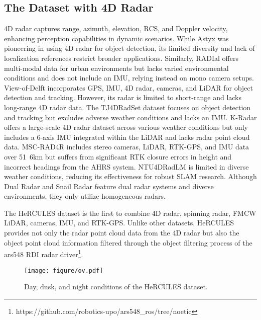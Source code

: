 \subsection{The Dataset with 4D Radar}
 4D radar captures range, azimuth, elevation, \ac{RCS}, and Doppler velocity, enhancing perception capabilities in dynamic scenarios. While Astyx \cite{8904734} was pioneering in using 4D radar for object detection, its limited diversity and lack of localization references restrict broader applications. Similarly, RADIal \cite{Rebut_2022_CVPR} offers multi-modal data for urban environments but lacks varied environmental conditions and does not include an \ac{IMU}, relying instead on mono camera setups.
View-of-Delft \cite{palffy2022multi} incorporates \ac{GPS}, \ac{IMU}, 4D radar, cameras, and \ac{LiDAR} for object detection and tracking. However, its radar is limited to short-range and lacks long-range 4D radar data. The TJ4DRadSet dataset \cite{zheng2022tj4dradset} focuses on object detection and tracking but excludes adverse weather conditions and lacks an \ac{IMU}. K-Radar \cite{paek2022k} offers a large-scale 4D radar dataset across various weather conditions but only includes a 6-axis \ac{IMU} integrated within the \ac{LiDAR} and lacks radar point cloud data. MSC-RAD4R \cite{choi2023msc} includes stereo cameras, \ac{LiDAR}, RTK-GPS, and \ac{IMU} data over \unit{51.6}{km} but suffers from significant RTK closure errors in height and incorrect headings from the \ac{AHRS} system. NTU4DRadLM \cite{zhang2023ntu4dradlm} is limited in diverse weather conditions, reducing its effectiveness for robust \ac{SLAM} research. Although Dual Radar \cite{zhang2023dual} and Snail Radar \cite{huai2024snail} feature dual radar systems and diverse environments, they only utilize homogeneous radars.

The HeRCULES dataset is the first to combine 4D radar, spinning radar, \ac{FMCW} \ac{LiDAR}, cameras, \ac{IMU}, and RTK-GPS. Unlike other datasets, HeRCULES provides not only the radar point cloud data from the 4D radar but also the object point cloud information filtered through the object filtering process of the ars548 RDI radar driver\footnote{https://github.com/robotics-upo/ars548\_ros/tree/noetic}.

\begin{figure}[!t]
    \centering
    \texttt{[image: figure/ov.pdf]}
    \caption{Day, dusk, and night conditions of the HeRCULES dataset.}
    \label{fig:overview}
    \vspace{-8mm}
\end{figure}

